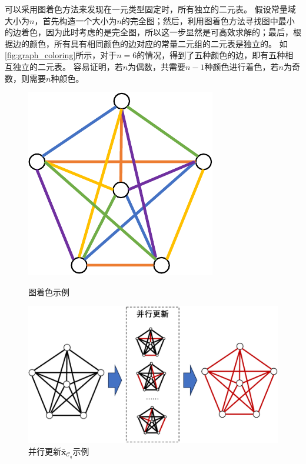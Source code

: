 \documentclass[12pt,UTF8,AutoFakeBold=3,a4paper]{ctexart} %
\newcommand{\vecx}{\mathbf{x}}
\begin{document}
可以采用图着色方法来发现在一元类型固定时，所有独立的二元表。
假设常量域大小为$n$，首先构造一个大小为$n$的完全图；然后，利用图着色方法寻找图中最小的边着色，因为此时考虑的是完全图，所以这一步显然是可高效求解的；最后，根据边的颜色，所有具有相同颜色的边对应的常量二元组的二元表是独立的。
如\cref{fig:graph_coloring}所示，对于$n=6$的情况，得到了五种颜色的边，即有五种相互独立的二元表。
容易证明，若$n$为偶数，共需要$n-1$种颜色进行着色，若$n$为奇数，则需要$n$种颜色。

\begin{figure}[!htb]
   \centering
   \begin{minipage}[t]{.3\textwidth}
    \centering
    \includegraphics[width=\linewidth]{figs/gpu_gibbs.pdf}
    \caption{图着色示例}
    \label{fig:graph_coloring}
   \end{minipage}
   \hspace{1cm}
   \begin{minipage}[t]{.6\textwidth}
    \centering
    \includegraphics[width=\linewidth]{figs/FO3_sampling.pdf}
    \caption{并行更新$\bar{\vecx}_{\mathcal{C}_q}$示例}
    \label{fig:gpu_gibbs}
   \end{minipage}
\end{figure}
\end{document}
